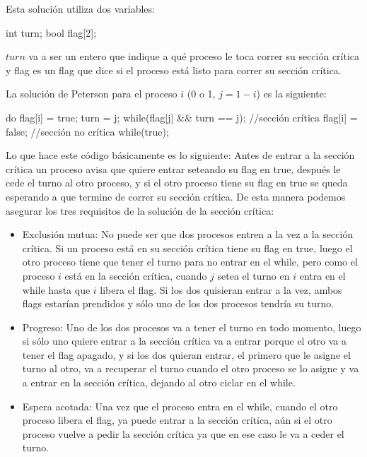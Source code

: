 \documentclass{article}
\begin{document}
Esta soluci\'on utiliza dos variables:

\begin{code}
int turn;
bool flag[2];
\end{code}

$turn$ va a ser un entero que indique a qu\'e proceso le toca correr su secci\'on cr\'itica y flag es un flag que dice si el proceso est\'a listo para correr su secci\'on cr\'itica.

La soluci\'on de Peterson para el proceso $i$ (0 o 1, $j = 1-i$) es la siguiente:

\begin{code}
do{
    flag[i] = true;
		turn = j;
		while(flag[j] && turn == j);
		//sección crítica
		flag[i] = false;
		//sección no crítica
}while(true);
\end{code}

Lo que hace este c\'odigo b\'asicamente es lo siguiente: Antes de entrar a la secci\'on cr\'itica un proceso avisa que quiere entrar seteando su flag en true, despu\'es le cede el turno al otro proceso, y si el otro proceso tiene su flag en true se queda esperando a que termine de correr su secci\'on cr\'itica. De esta manera podemos asegurar los tres requisitos de la soluci\'on de la secci\'on cr\'itica:

\begin{itemize}
\item Exclusi\'on mutua: No puede ser que dos procesos entren a la vez a la secci\'on cr\'itica. Si un proceso est\'a en su secci\'on cr\'itica tiene su flag en true, luego el otro proceso tiene que tener el turno para no entrar en el while, pero como el proceso $i$ est\'a en la secci\'on cr\'itica, cuando $j$ setea el turno en $i$ entra en el while hasta que $i$ libera el flag. Si los dos quisieran entrar a la vez, ambos flags estar\'ian prendidos y s\'olo uno de los dos procesos tendr\'ia su turno.
\item Progreso: Uno de los dos procesos va a tener el turno en todo momento, luego si s\'olo uno quiere entrar a la secci\'on cr\'itica va a entrar porque el otro va a tener el flag apagado, y si los dos quieran entrar, el primero que le asigne el turno al otro, va a recuperar el turno cuando el otro proceso se lo asigne y va a entrar en la secci\'on cr\'itica, dejando al otro ciclar en el while.
\item Espera acotada: Una vez que el proceso entra en el while, cuando el otro proceso libera el flag, ya puede entrar a la secci\'on cr\'itica, a\'un si el otro proceso vuelve a pedir la secci\'on cr\'itica ya que en ese caso le va a ceder el turno.
\end{itemize}
\end{document}
